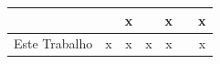 \begin{table}
\begin{tabular}{l|c|c|l|c|c|c|}
\multicolumn{1}{|l|}{\cite{Neumann2014}}        & \multicolumn{1}{l|}{} & x                     &                               & x                      & \multicolumn{1}{l|}{} & x                     \\ \hline
\multicolumn{1}{|l|}{Este Trabalho}             & x                     & x                     & \multicolumn{1}{c|}{x}        & x                      & \multicolumn{1}{l|}{} & x                     \\ \hline
\end{tabular}

\end{table}

